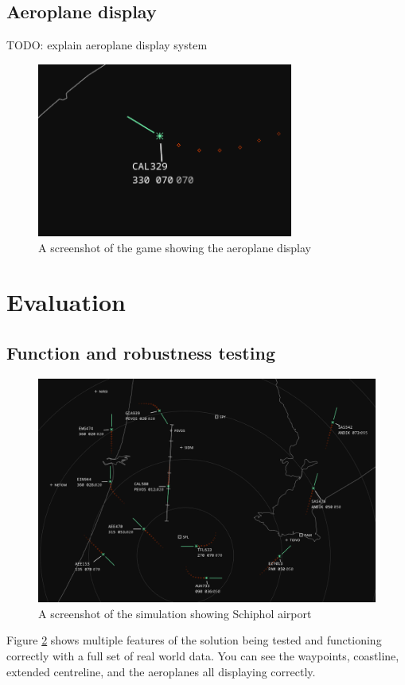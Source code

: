 \documentclass{article}
\begin{document}
\subsection{Aeroplane display}
TODO: explain aeroplane display system
\begin{figure}[H]
\centering
\includegraphics[width=0.75\textwidth]{screenshots/aeroplane.png}
\caption{\label{fig:aeroplane}A screenshot of the game showing the aeroplane display}
\end{figure}

\clearpage
\section{Evaluation}
\subsection{Function and robustness testing}
\begin{figure}[H]
\centering
\includegraphics[width=\textwidth]{screenshots/schiphol2.png}
\caption{\label{fig:schiphol}A screenshot of the simulation showing Schiphol airport}
\end{figure}
Figure \ref{fig:schiphol} shows multiple features of the solution being tested and functioning correctly with a full set of real world data.
You can see the waypoints, coastline, extended centreline, and the aeroplanes all displaying correctly.
\end{document}
